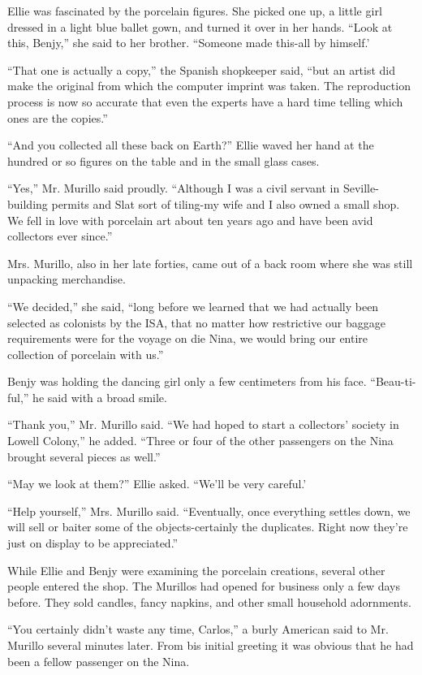 \documentclass[]{article}
\begin{document}
{Ellie was fascinated by the porcelain figures.  She picked one up, a little girl dressed in a light blue ballet gown, and turned it over in her hands.  “Look at this, Benjy,” she said to her brother.  “Someone made this-all by himself.’

“That one is actually a copy,” the Spanish shopkeeper said, “but an artist did make the original from which the computer imprint was taken.  The reproduction process is now so accurate that even the experts have a hard time telling which ones are the copies.”

“And you collected all these back on Earth?” Ellie waved her hand at the hundred or so figures on the table and in the small glass cases.

“Yes,” Mr.  Murillo said proudly.  “Although I was a civil servant in Seville-building permits and Slat sort of tiling-my wife and I also owned a small shop.  We fell in love with porcelain art about ten years ago and have been avid collectors ever since.”

Mrs.  Murillo, also in her late forties, came out of a back room where she was still unpacking merchandise.

“We decided,” she said, “long before we learned that we had actually been selected as colonists by the ISA, that no matter how restrictive our baggage requirements were for the voyage on die Nina, we would bring our entire collection of porcelain with us.”

Benjy was holding the dancing girl only a few centimeters from his face.  “Beau-ti-ful,” he said with a broad smile.

“Thank you,” Mr.  Murillo said.  “We had hoped to start a collectors’ society in Lowell Colony,” he added.  “Three or four of the other passengers on the Nina brought several pieces as well.”

“May we look at them?” Ellie asked.  “We’ll be very careful.’

“Help yourself,” Mrs.  Murillo said.  “Eventually, once everything settles down, we will sell or baiter some of the objects-certainly the duplicates.  Right now they’re just on display to be appreciated.”

While Ellie and Benjy were examining the porcelain creations, several other people entered the shop.  The Murillos had opened for business only a few days before.  They sold candles, fancy napkins, and other small household adornments.

“You certainly didn’t waste any time, Carlos,” a burly American said to Mr.  Murillo several minutes later.  From bis initial greeting it was obvious that he had been a fellow passenger on the Nina.

}
\end{document}
